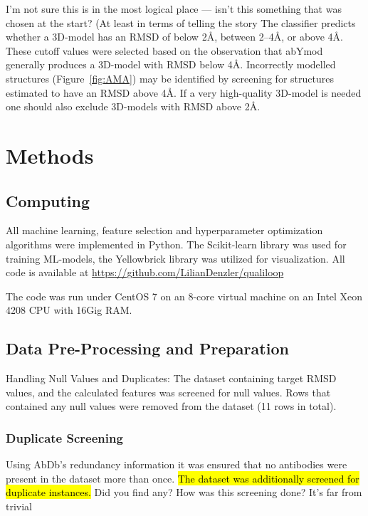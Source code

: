 \documentclass[12pt]{article}
\newcommand{\lilian}[1]{ {\color{red}{\bfseries Lilian:} #1}}
\newcommand{\highlight}[1]{\hl{#1}}
\begin{document}
\lilian{I'm not sure this is in the most logical place --- isn't this
  something that was chosen at the start? (At least in terms of
  telling the story}
The classifier predicts whether a 3D-model has an RMSD of below 2\AA,
between 2--4\AA, or above 4\AA. These cutoff values were selected
based on the observation that abYmod generally produces a 3D-model with
RMSD below 4\AA. Incorrectly modelled structures (Figure~\ref{fig:AMA}) may
be identified by screening for structures estimated to have an RMSD
above 4\AA. If a very high-quality 3D-model is needed one should also
exclude 3D-models with RMSD above 2\AA.


\section{Methods}

\subsection{Computing}
All machine learning, feature selection and hyperparameter
optimization algorithms were implemented in Python. The Scikit-learn
library was used for training ML-models, the
Yellowbrick\cite{Bengfort2021} library was utilized for
visualization. All code is available at
\url{https://github.com/LilianDenzler/qualiloop}

The code was run under CentOS 7 on an 8-core virtual machine on an
Intel Xeon 4208 CPU with 16Gig RAM.

\subsection{Data Pre-Processing and Preparation}
Handling Null Values and Duplicates: The dataset containing target
RMSD values, and the calculated features was screened for null
values.
Rows that contained any null values were
removed from the dataset (11 rows in total).

\subsubsection{Duplicate Screening}
Using AbDb's redundancy information it was ensured that no antibodies
were present in the dataset more than once. \highlight{The dataset was
  additionally screened for duplicate instances.}
\lilian{Did you find any? How was this screening done? It's far from trivial}
\end{document}
